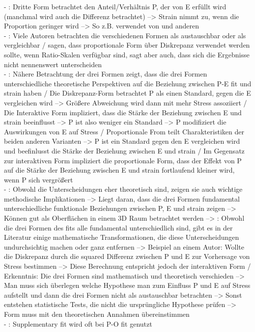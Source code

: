 - \cite[S. 5]{edwards:1990}: Dritte Form betrachtet den Anteil/Verhältnis P, der von E erfüllt wird (manchmal wird auch die Differenz betrachtet) --> Strain nimmt zu, wenn die Proportion geringer wird --> So z.B. verwendet von \textcite{mechanismsOfJobStressAndStrain:1982} und anderen \\
- \cite[S. 5]{edwards:1990}: Viele Autoren betrachten die verschiedenen Formen als austauschbar oder als vergleichbar /  \textcite{mechanismsOfJobStressAndStrain:1982} sagen, dass proportionale Form über Diskrepanz verwendet werden sollte, wenn Ratio-Skalen verfügbar sind, sagt aber auch, dass sich die Ergebnisse nicht nennenswert unterscheiden \\
- \cite[S. 5]{edwards:1990}: Nähere Betrachtung der drei Formen zeigt, dass die drei Formen unterschiedliche theoretische Perspektiven auf die Beziehung zwischen P-E fit und strain haben / Die Diskrepanz-Form betrachtet P als einen Standard, gegen die E vergleichen wird --> Größere Abweichung wird dann mit mehr Stress assoziiert / Die Interaktive Form impliziert, dass die Stärke der Beziehung zwischen E und strain beeinflusst --> P ist also weniger ein Standard --> P modifiziert die Auswirkungen von E auf Stress / Proportionale From teilt Charakteristiken der beiden anderen Varianten --> P ist ein Standard gegen den E vergleichen wird und beefinlusst die Stärke der Beziehung zwischen E und strain / Im Gegensatz zur interaktiven Form impliziert die proportionale Form, dass der Effekt von P auf die Stärke der Beziehung zwischen E und strain fortlaufend kleiner wird, wenn P sich vergrößert \\
- \cite[S. 5]{edwards:1990}: Obwohl die Unterscheidungen eher theoretisch sind, zeigen sie auch wichtige methodische Implikationen --> Liegt daran, dass die drei Formen fundamental unterschiedliche funktionale Beziehungen zwischen P, E und strain zeigen --> Können gut als Oberflächen in einem 3D Raum betrachtet werden --> \cite[S. 7]{edwards:1990}: Obwohl die drei Formen des fits alle fundamental unterschiedlich sind, gibt es in der Literatur einige mathematische Transformationen, die diese Unterscheidungen undurchsichtig machen oder ganz entfernen --> Beispiel an einem Autor: Wollte die Diskrepanz durch die squared Differenz zwischen P und E zur Vorhersage von Stress bestimmen --> Diese Berechnung entspricht jedoch der interaktiven Form / Erkenntnis: Die drei Formen sind mathematisch und theoretisch verschieden --> Man muss sich überlegen welche Hypothese man zum Einfluss P und E auf Stress aufstellt und dann die drei Formen nicht als austauschbar betrachten --> Sonst entstehen statistische Tests, die nicht die ursprüngliche Hypothese prüfen --> Form muss mit den theoretischen Annahmen übereinstimmen \\
- \cite[S. 6]{edwards:2007}: Supplementary fit wird oft bei P-O fit genutzt

